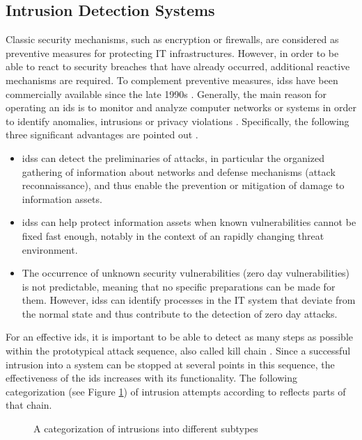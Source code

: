 \documentclass[../../../main.tex]{subfiles}
\begin{document}
\subsection{Intrusion Detection Systems} \label{subsec:intrusion_detection_systems}
Classic security mechanisms, such as encryption or firewalls, are considered as preventive measures for protecting IT infrastructures. However, in order to be able to react to security breaches that have already occurred, additional reactive mechanisms are required. To complement preventive measures, \glspl{ids} have been commercially available since the late 1990s \cite[27]{whitman_principles_2018}. Generally, the main reason for operating an \gls{ids} is to monitor and analyze computer networks or systems in order to identify anomalies, intrusions or privacy violations \cite{hindy2020taxonomy}. Specifically, the following three significant advantages are pointed out \cite[391]{whitman_principles_2018}.

\begin{itemize}
    \item \glspl{ids} can detect the preliminaries of attacks, in particular the organized gathering of information about networks and defense mechanisms (attack reconnaissance), and thus enable the prevention or mitigation of damage to information assets.
    \item \glspl{ids} can help protect information assets when known vulnerabilities cannot be fixed fast enough, notably in the context of an rapidly changing threat environment.
    \item The occurrence of unknown security vulnerabilities (zero day vulnerabilities) is not predictable, meaning that no specific preparations can be made for them. However, \glspl{ids} can identify processes in the IT system that deviate from the normal state and thus contribute to the detection of zero day attacks.
\end{itemize}

For an effective \gls{ids}, it is important to be able to detect as many steps as possible within the prototypical attack sequence, also called kill chain \cite[393]{whitman_principles_2018}. Since a successful intrusion into a system can be stopped at several points in this sequence, the effectiveness of the \gls{ids} increases with its functionality. The following categorization (see Figure \ref{fig:intrusion-taxonomy}) of intrusion attempts according to \cite{kendall1999database} reflects parts of that chain.

\begin{figure}[t]
    \centering
    
    \caption{A categorization of intrusions into different subtypes}
    \label{fig:intrusion-taxonomy}
\end{figure}
\end{document}
